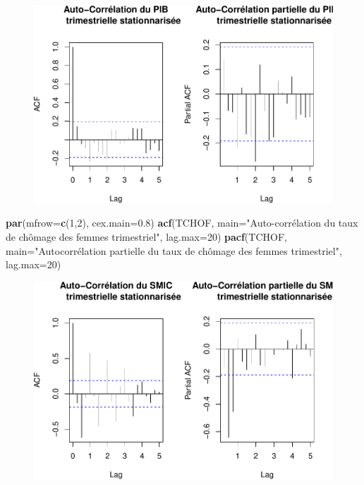 \documentclass[11pt,]{article}
\newenvironment{Shaded}{\begin{snugshade}}{\end{snugshade}}
\newcommand{\KeywordTok}[1]{\textcolor[rgb]{0.13,0.29,0.53}{\textbf{#1}}}
\newcommand{\DataTypeTok}[1]{\textcolor[rgb]{0.13,0.29,0.53}{#1}}
\newcommand{\DecValTok}[1]{\textcolor[rgb]{0.00,0.00,0.81}{#1}}
\newcommand{\FloatTok}[1]{\textcolor[rgb]{0.00,0.00,0.81}{#1}}
\newcommand{\StringTok}[1]{\textcolor[rgb]{0.31,0.60,0.02}{#1}}
\newcommand{\NormalTok}[1]{#1}
\begin{document}
\begin{figure}

{\centering \includegraphics{doc_files/figure-latex/unnamed-chunk-7-1} 

}

\caption{\label{fig7}}\label{fig:unnamed-chunk-7}
\end{figure}

\begin{Shaded}
\begin{Highlighting}[]
  \KeywordTok{par}\NormalTok{(}\DataTypeTok{mfrow=}\KeywordTok{c}\NormalTok{(}\DecValTok{1}\NormalTok{,}\DecValTok{2}\NormalTok{), }\DataTypeTok{cex.main=}\FloatTok{0.8}\NormalTok{)}
  \KeywordTok{acf}\NormalTok{(TCHOF, }\DataTypeTok{main=}\StringTok{"Auto-corrélation du taux de}
\StringTok{      chômage des femmes trimestriel"}\NormalTok{, }\DataTypeTok{lag.max=}\DecValTok{20}\NormalTok{)}
  \KeywordTok{pacf}\NormalTok{(TCHOF, }\DataTypeTok{main=}\StringTok{"Autocorrélation partielle du}
\StringTok{       taux de chômage des femmes trimestriel"}\NormalTok{, }\DataTypeTok{lag.max=}\DecValTok{20}\NormalTok{)}
\end{Highlighting}
\end{Shaded}

\begin{figure}
\centering
\includegraphics{doc_files/figure-latex/unnamed-chunk-8-1.pdf}
\caption{\label{fig8}}
\end{figure}
\end{document}
